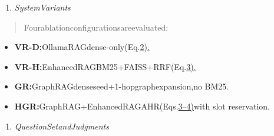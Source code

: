\documentclass[
]{article}
\begin{document}
\begin{enumerate}
\def\labelenumi{\Alph{enumi}.}
\setcounter{enumi}{1}
\item
  \emph{SystemVariants}
\end{enumerate}

\begin{quote}
Fourablationconfigurationsareevaluated:
\end{quote}

\begin{itemize}
\item
  \textbf{VR-D:}OllamaRAGdense-only(Eq.\hyperref[_bookmark5]{2).}
\item
  \textbf{VR-H:}EnhancedRAGBM25+FAISS+RRF(Eq.\hyperref[_bookmark6]{3).}
\item
  \textbf{GR:}GraphRAGdenseseed+1-hopgraphexpansion,no BM25.
\item
  \textbf{HGR:}GraphRAG+EnhancedRAGAHR(Eqs.\hyperref[_bookmark4]{3--4)}with slot reservation.
\end{itemize}

\begin{enumerate}
\def\labelenumi{\Alph{enumi}.}
\setcounter{enumi}{2}
\item
  \emph{QuestionSetandJudgments}
\end{enumerate}
\end{document}
